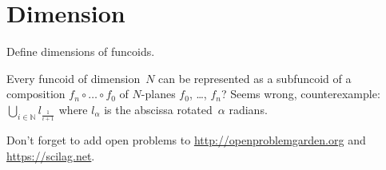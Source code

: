 \documentclass{amsart}
\begin{document}
\section{Dimension}

Define dimensions of funcoids.

Every funcoid of dimension~$N$ can be represented as
a subfuncoid of a composition $f_n\circ\dots\circ f_0$ of $N$-planes
$f_0$, \dots, $f_n$? Seems wrong, counterexample:
$\bigcup_{i\in\mathbb{N}} l_{\frac{1}{i+1}}$ where $l_\alpha$ is the
abscissa rotated~$\alpha$ radians.

Don't forget to add open problems to
\url{http://openproblemgarden.org} and
\url{https://scilag.net}.



\end{document}
